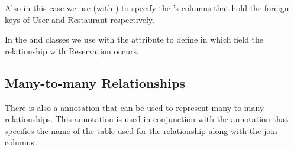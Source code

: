 Also in this case we use  (with ) to specify
the 's columns that hold the foreign keys of User and
Restaurant respectively.

In the  and  classes we use  with
the  attribute to define in which field the relationship with
Reservation occurs.

\subsection{Many-to-many Relationships}

There is also a  annotation that can be used to represent
many-to-many relationships. This annotation is used in conjunction with the
 annotation that specifies the name of the table used for the
relationship along with the join columns:


